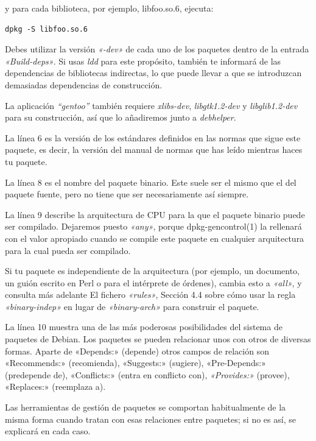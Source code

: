 \documentclass[letterpaper,12pt,spanish]{manual}
\begin{document}
y para cada biblioteca, por ejemplo, libfoo.so.6, ejecuta:

\begin{Verbatim}[commandchars=@\[\]]
dpkg -S libfoo.so.6
\end{Verbatim}

Debes utilizar la versión \emph{«-dev»} de cada uno de los paquetes dentro de la entrada \emph{«Build-deps»}. Si usas \emph{ldd} para este propósito, también te informará de las dependencias de bibliotecas indirectas, lo que puede llevar a que se introduzcan demasiadas dependencias de construcción.

La aplicación \emph{``gentoo''} también requiere \emph{xlibs-dev}, \emph{libgtk1.2-dev} y \emph{libglib1.2-dev} para su construcción, así que lo añadiremos junto a \emph{debhelper}.

La línea 6 es la versión de los estándares definidos en las normas que sigue este paquete, es decir, la versión del manual de normas que has leído mientras haces tu paquete.

La línea 8 es el nombre del paquete binario. Este suele ser el mismo que el del paquete fuente, pero no tiene que ser necesariamente así siempre.

La línea 9 describe la arquitectura de CPU para la que el paquete binario puede ser compilado. Dejaremos puesto \emph{«any»}, porque dpkg-gencontrol(1) la rellenará con el valor apropiado cuando se compile este paquete en cualquier arquitectura para la cual pueda ser compilado.

Si tu paquete es independiente de la arquitectura (por ejemplo, un documento, un guión escrito en Perl o para el intérprete de órdenes), cambia esto a \emph{«all»}, y consulta más adelante El fichero \emph{«rules»}, Sección 4.4 sobre cómo usar la regla \emph{«binary-indep»} en lugar de \emph{«binary-arch»} para construir el paquete.

La línea 10 muestra una de las más poderosas posibilidades del sistema de paquetes de Debian. Los paquetes se pueden relacionar unos con otros de diversas formas. Aparte de «Depends:» (depende) otros campos de relación son «Recommends:» (recomienda), «Suggests:» (sugiere), «Pre-Depends:» (predepende de), «Conflicts:» (entra en conflicto con), \emph{«Provides:»} (provee), «Replaces:» (reemplaza a).

Las herramientas de gestión de paquetes se comportan habitualmente de la misma forma cuando tratan con esas relaciones entre paquetes; si no es así, se explicará en cada caso.
\end{document}
